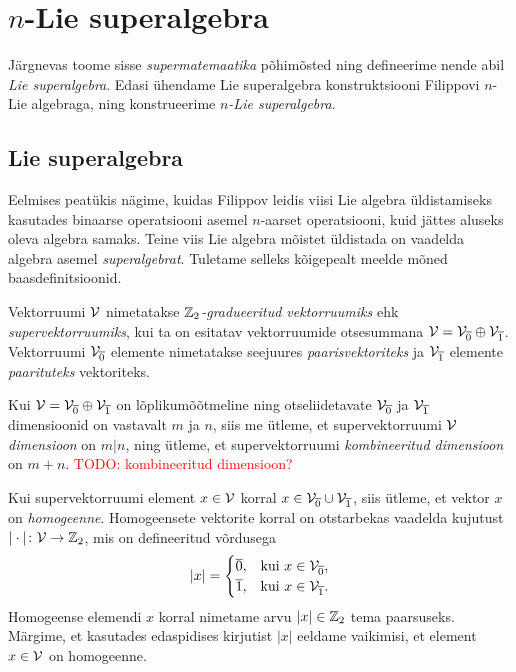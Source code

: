 

\section{\texorpdfstring{$n$}{n}-Lie superalgebra}

Järgnevas toome sisse \emph{supermatemaatika} põhimõsted ning defineerime
nende abil \emph{Lie superalgebra}. Edasi ühendame Lie superalgebra
konstruktsiooni Filippovi $n$-Lie algebraga, ning konstrueerime
\emph{$n$-Lie superalgebra}.

\subsection{Lie superalgebra}

Eelmises peatükis nägime, kuidas Filippov leidis viisi Lie algebra
üldistamiseks kasutades binaarse operatsiooni asemel $n$-aarset
operatsiooni, kuid jättes aluseks oleva algebra samaks. Teine viis
Lie algebra mõistet üldistada on vaadelda algebra asemel \emph{superalgebrat}.
Tuletame selleks kõigepealt meelde mõned baasdefinitsioonid.

\begin{dfn}
    Vektorruumi $\mathcal{V}$ nimetatakse \emph{$\mathbb{Z}_2$-gradueeritud vektorruumiks}
    ehk \emph{supervektorruumiks}, kui ta on esitatav vektorruumide
    otsesummana $\mathcal{V} = \mathcal{V}_{\overline{0}} \oplus \mathcal{V}_{\overline{1}}$.
    Vektorruumi $\mathcal{V}_{\overline{0}}$ elemente nimetatakse seejuures
    \emph{paarisvektoriteks} ja $\mathcal{V}_{\overline{1}}$ elemente
    \emph{paarituteks} vektoriteks.
\end{dfn}

Kui $\mathcal{V} = \mathcal{V}_{\overline{0}} \oplus \mathcal{V}_{\overline{1}}$ on
lõplikumõõtmeline ning otseliidetavate $\mathcal{V}_{\overline{0}}$ ja
$\mathcal{V}_{\overline{1}}$ dimensioonid on vastavalt $m$ ja $n$, siis
me ütleme, et supervektorruumi $\mathcal{V}$ \emph{dimensioon} on $m|n$, ning
ütleme, et supervektorruumi \emph{kombineeritud dimensioon} on $m+n$.
\textcolor{red}{TODO: kombineeritud dimensioon?}

Kui supervektorruumi element $x \in \mathcal{V}$ korral
$x \in \mathcal{V}_{\overline{0}} \cup \mathcal{V}_{\overline{1}}$, siis ütleme, et
vektor $x$ on \emph{homogeenne}. Homogeensete vektorite korral on
otstarbekas vaadelda kujutust $|\cdot| \colon \mathcal{V} \to \mathbb{Z}_2$, mis on defineeritud
võrdusega
\begin{align*}
    |x| = \begin{cases}
        \overline{0}, &\text{kui}\ x \in \mathcal{V}_{\overline{0}}, \\
        \overline{1}, &\text{kui}\ x \in \mathcal{V}_{\overline{1}}.
    \end{cases}
\end{align*}
Homogeense elemendi $x$ korral nimetame arvu $|x| \in \mathbb{Z}_2$ tema
paarsuseks. Märgime, et kasutades edaspidises kirjutist $|x|$ eeldame
vaikimisi, et element $x \in \mathcal{V}$ on homogeenne.

